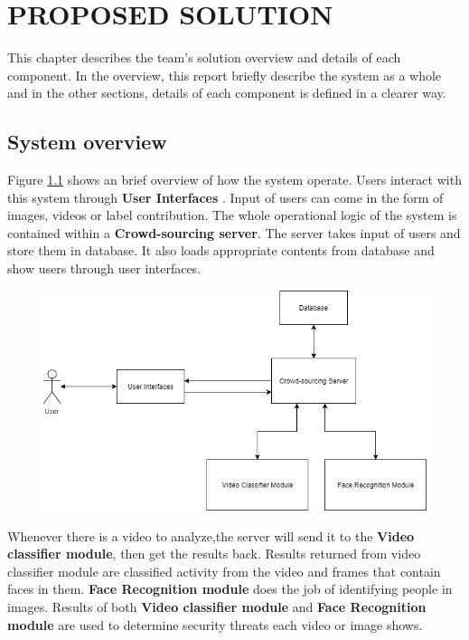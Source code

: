 \chapter{PROPOSED SOLUTION}
\label{chap:solution}

This chapter describes the team's solution overview and details of each component. In the overview, this report briefly describe the system as a whole and in the other sections, details of each component is defined in a clearer way.
\section{System overview}

Figure \ref{chap3:system_overview_basic} shows an brief overview of how the system operate. Users interact with this system through \textbf{User Interfaces}
. Input of users can come in the form of images, videos or label contribution. The whole operational logic of the  system is contained within a \textbf{Crowd-sourcing server}. The server takes input of users and store them in database. It also loads appropriate contents from database and show users through user interfaces. 
\begin{center}
    \begin{figure}[H]
    \centering
    \includegraphics[width=1\columnwidth]{images/chap3/system_overview_basic.png}
    \label{chap3:system_overview_basic}
    \end{figure}
\end{center}
Whenever there is a video to analyze,the server will send it to the \textbf{Video classifier module}, then get the results back. Results returned from video classifier module are classified activity from the video and frames that contain faces in them. \textbf{Face Recognition module} does the job of identifying people in images. Results of both \textbf{Video classifier module} and \textbf{Face Recognition module} are used to determine security threats each video or image shows.
